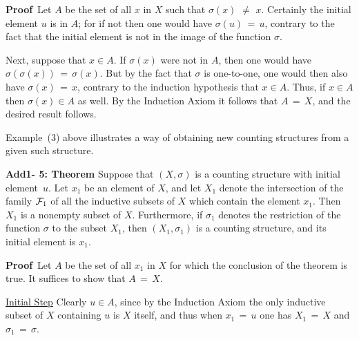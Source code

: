 {\V

        {\bf Proof}\,  Let $A$ be the set of all $x$ in $X$ such that ${\sigma}(x) \,\,{\neq}\,\, x$.
    Certainly the initial element $u$ is in $A$; for if not then one would have ${\sigma}(u) \,=\, u$, contrary to the fact that the initial element is not in the image of the function ${\sigma}$.

        Next, suppose that $x{\in}A$. If ${\sigma}(x)$ were not in $A$, then one would have ${\sigma}({\sigma}(x)) \,=\, {\sigma}(x)$.
    But by the fact that ${\sigma}$ is one-to-one, one would then also have ${\sigma}(x) \,=\, x$, contrary to the induction hypothesis that $x{\in}A$.
    Thus, if $x{\in}A$ then ${\sigma}(x){\in}A$ as well.
    By the Induction Axiom it follows that $A \,=\, X$, and the desired result follows.

\V
\V


        Example~(3) above illustrates a way of obtaining new counting structures from a given such structure.

\V

        {\bf Add1- 5: Theorem} Suppose that $(X,{\sigma})$ is a counting structure with initial element~$u$.
    Let $x_{1}$ be an element of $X$, and let $X_{1}$ denote the intersection of the family ${\cal F}_{1}$ of all the inductive subsets of $X$ which contain the element $x_{1}$.
    Then $X_{1}$ is a nonempty subset of $X$.
    Furthermore, if ${\sigma}_{1}$ denotes the restriction of the function ${\sigma}$ to the subset $X_{1}$,
    then $(X_{1},{\sigma}_{1})$ is a counting structure, and its initial element is $x_{1}$.

\V

        {\bf Proof}\,  Let $A$ be the set of all $x_{1}$ in $X$ for which the conclusion of the theorem is true.
    It suffices to show that $A \,=\, X$.

        \underline{Initial Step} Clearly $u{\in}A$, since by the Induction Axiom the only inductive subset of $X$ containing $u$ is $X$ itself, and thus when $x_{1} \,=\, u$ one has $X_{1} \,=\, X$ and ${\sigma}_{1} \,=\, {\sigma}$.

}

